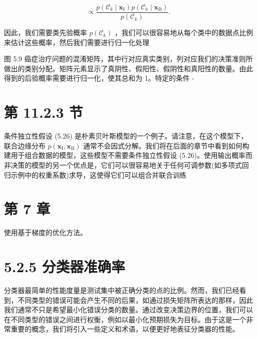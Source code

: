 \documentclass[10pt]{report}
\begin{document}
\[
\propto  \frac{p\left( {{\mathcal{C}}_{k} \mid  {\mathbf{x}}_{\mathrm{I}}}\right) p\left( {{\mathcal{C}}_{k} \mid  {\mathbf{x}}_{\mathrm{B}}}\right) }{p\left( {\mathcal{C}}_{k}\right) }. \tag{5.27}
\]

因此，我们需要类先验概率 \(p\left( {\mathcal{C}}_{k}\right)\) ，我们可以很容易地从每个类中的数据点比例来估计这些概率，然后我们需要进行归一化处理

图 5.9 癌症治疗问题的混淆矩阵，其中行对应真实类别，列对应我们的决策准则所做出的类别分配。矩阵元素显示了真阴性、假阳性、假阴性和真阳性的数量。由此得到的后验概率需要进行归一化，使其总和为 1。特定的条件 -

\begin{center}
\end{center}

\section*{第 11.2.3 节}

条件独立性假设 (5.26) 是朴素贝叶斯模型的一个例子。请注意，在这个模型下，联合边缘分布 \(p\left( {{\mathbf{x}}_{\mathrm{I}},{\mathbf{x}}_{\mathrm{B}}}\right)\) 通常不会因式分解。我们将在后面的章节中看到如何构建用于组合数据的模型，这些模型不需要条件独立性假设 (5.26)。使用输出概率而非决策的模型的另一个优点是，它们可以很容易地关于任何可调参数(如多项式回归示例中的权重系数)求导，这使得它们可以组合并联合训练

\section*{第 7 章}

使用基于梯度的优化方法。

\section*{5.2.5 分类器准确率}

分类器最简单的性能度量是测试集中被正确分类的点的比例。然而，我们已经看到，不同类型的错误可能会产生不同的后果，如通过损失矩阵所表达的那样，因此我们通常不只是希望最小化错误分类的数量。通过改变决策边界的位置，我们可以在不同类型的错误之间进行权衡，例如以最小化预期损失为目标。由于这是一个非常重要的概念，我们将引入一些定义和术语，以便更好地表征分类器的性能。
\end{document}
